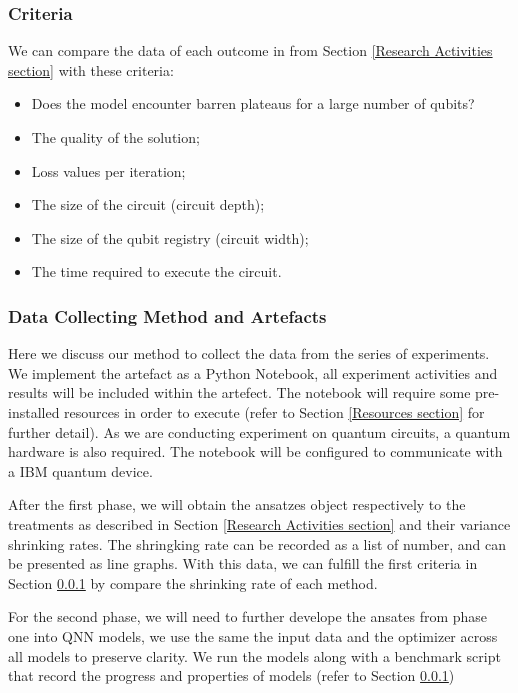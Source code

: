 \subsubsection{Criteria}
\label{Criteria section}
We can compare the data of each outcome in from Section \ref{Research Activities section} with these criteria:
\begin{itemize}
    \item Does the model encounter barren plateaus for a large number of qubits?
    \item The quality of the solution;
    \item Loss values per iteration;
    \item The size of the circuit (circuit depth);
    \item The size of the qubit registry (circuit width);
    \item The time required to execute the circuit.
\end{itemize}

\subsubsection{Data Collecting Method and Artefacts}
\label{Data Collecting Section}
Here we discuss our method to collect the data from the series of experiments.
We implement the artefact as a Python Notebook, all experiment activities and results will be included within the artefect.
The notebook will require some pre-installed resources in order to execute (refer to Section \ref{Resources section} for further detail).
As we are conducting experiment on quantum circuits, a quantum hardware is also required.
The notebook will be configured to communicate with a IBM quantum device.

After the first phase, we will obtain the ansatzes object respectively to the treatments as described in Section \ref{Research Activities section} and their variance shrinking rates.
The shringking rate can be recorded as a list of number, and can be presented as line graphs.
With this data, we can fulfill the first criteria in Section \ref{Criteria section} by compare the shrinking rate of each method.

For the second phase, we will need to further develope the ansates from phase one into QNN models, we use the same the input data and the optimizer across all models to preserve clarity.
We run the models along with a benchmark script that record the progress and properties of models (refer to Section \ref{Criteria section})


